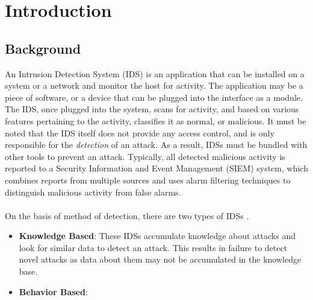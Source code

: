 
\chapter{Introduction}
\label{ch:INTR}
\section{Background}
An Intrusion Detection System (IDS) is an application that can be installed on a system or a network and monitor the host for activity. The application may be a piece of software, or a device that can be plugged into the interface as a module. The IDS, once plugged into the system, scans for activity, and based on various features pertaining to the activity, classifies it as normal, or malicious. It must be noted that the IDS itself does not provide any access control, and is only responsible for the \textit{detection} of an attack. As a result, IDSs must be bundled with other tools to prevent an attack. Typically, all detected malicious activity is reported to a Security Information and Event Management (SIEM) system, which combines reports from multiple sources and uses alarm filtering techniques to distinguish malicious activity from false alarms.\\
\\
On the basis of method of detection, there are two types of IDSs \cite{ids_taxonomy}.
\begin{itemize}
    \item \textbf{Knowledge Based}: These IDSs accumulate knowledge about attacks and look for similar data to detect an attack. This results in failure to detect novel attacks as data about them may not be accumulated in the knowledge base.
    \item \textbf{Behavior Based}:
\end{itemize}
